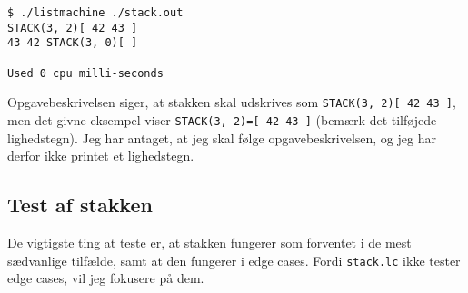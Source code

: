 \begin{verbatim}
$ ./listmachine ./stack.out
STACK(3, 2)[ 42 43 ]
43 42 STACK(3, 0)[ ]

Used 0 cpu milli-seconds
\end{verbatim}

Opgavebeskrivelsen siger, at stakken skal udskrives som \texttt{STACK(3, 2)[ 42 43 ]}, men det givne eksempel viser \texttt{STACK(3, 2)=[ 42 43 ]} (bemærk det tilføjede lighedstegn). Jeg har antaget, at jeg skal følge opgavebeskrivelsen, og jeg har derfor ikke printet et lighedstegn.

\subsection{Test af stakken}

De vigtigste ting at teste er, at stakken fungerer som forventet i de mest sædvanlige tilfælde, samt at den fungerer i edge cases. Fordi \texttt{stack.lc} ikke tester edge cases, vil jeg fokusere på dem.

